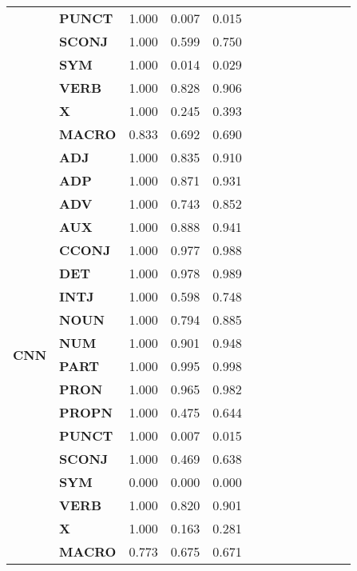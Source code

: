 \begin{longtable}{|l||l||l||l||l||l||l||l||l||l||l||l||l|}
\textbf{} & \textbf{PUNCT} & 1.000 & 0.007 & 0.015 \\
\textbf{} & \textbf{SCONJ} & 1.000 & 0.599 & 0.750 \\
\textbf{} & \textbf{SYM} & 1.000 & 0.014 & 0.029 \\
\textbf{} & \textbf{VERB} & 1.000 & 0.828 & 0.906 \\
\textbf{} & \textbf{X} & 1.000 & 0.245 & 0.393 \\
\textbf{} & \textbf{MACRO} & 0.833 & 0.692 & 0.690 \\
\cline{1-5}
\multirow[t]{18}{*}{\textbf{CNN}} & \textbf{ADJ} & 1.000 & 0.835 & 0.910 \\
\textbf{} & \textbf{ADP} & 1.000 & 0.871 & 0.931 \\
\textbf{} & \textbf{ADV} & 1.000 & 0.743 & 0.852 \\
\textbf{} & \textbf{AUX} & 1.000 & 0.888 & 0.941 \\
\textbf{} & \textbf{CCONJ} & 1.000 & 0.977 & 0.988 \\
\textbf{} & \textbf{DET} & 1.000 & 0.978 & 0.989 \\
\textbf{} & \textbf{INTJ} & 1.000 & 0.598 & 0.748 \\
\textbf{} & \textbf{NOUN} & 1.000 & 0.794 & 0.885 \\
\textbf{} & \textbf{NUM} & 1.000 & 0.901 & 0.948 \\
\textbf{} & \textbf{PART} & 1.000 & 0.995 & 0.998 \\
\textbf{} & \textbf{PRON} & 1.000 & 0.965 & 0.982 \\
\textbf{} & \textbf{PROPN} & 1.000 & 0.475 & 0.644 \\
\textbf{} & \textbf{PUNCT} & 1.000 & 0.007 & 0.015 \\
\textbf{} & \textbf{SCONJ} & 1.000 & 0.469 & 0.638 \\
\textbf{} & \textbf{SYM} & 0.000 & 0.000 & 0.000 \\
\textbf{} & \textbf{VERB} & 1.000 & 0.820 & 0.901 \\
\textbf{} & \textbf{X} & 1.000 & 0.163 & 0.281 \\
\textbf{} & \textbf{MACRO} & 0.773 & 0.675 & 0.671 \\
\cline{1-5}
\end{longtable}
